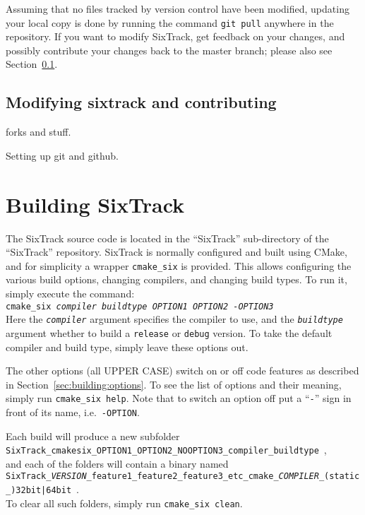 \documentclass[english]{article}
\begin{document}
Assuming that no files tracked by version control have been modified, updating your local copy is done by running the command
\texttt{git pull} anywhere in the repository.
If you want to modify SixTrack, get feedback on your changes, and possibly contribute your changes back to the master branch; please also see Section~\ref{sec:downloading:contributing}.

\subsection{Modifying sixtrack and contributing}
\label{sec:downloading:contributing}


forks and stuff.

Setting up git and github.


\section{Building SixTrack}
\label{sec:building}

The SixTrack source code is located in the ``SixTrack'' sub-directory of the ``SixTrack'' repository.
SixTrack is normally configured and built using CMake, and for simplicity a wrapper \texttt{cmake\_six} is provided.
This allows configuring the various build options, changing compilers, and changing build types.
To run it, simply execute the command:\\
\texttt{cmake\_six \textit{compiler} \textit{buildtype} \textit{OPTION1} \textit{OPTION2} \textit{-OPTION3}}\\
Here the \texttt{\textit{compiler}} argument specifies the compiler to use, and the \texttt{\textit{buildtype}} argument whether to build a \texttt{release} or \texttt{debug} version.
To take the default compiler and build type, simply leave these options out.

The other options (all UPPER CASE) switch on or off code features as described in Section~\ref{sec:building:options}.
To see the list of options and their meaning, simply run \texttt{cmake\_six help}.
Note that to switch an option off put a ``\texttt{-}'' sign in front of its name, i.e.\ \texttt{-OPTION}.

Each build will produce a new subfolder\\
{
  \texttt{SixTrack\_\-cmakesix\_\-OPTION1\_\-OPTION2\_\-NOOPTION3\_\-compiler\_\-buildtype}~,\\
}
and each of the folders will contain a binary named\\
{\scriptsize
  \texttt{SixTrack\_\textit{VERSION}\_feature1\_feature2\_feature3\_etc\_cmake\_\textit{COMPILER}\_(static\_){32bit|64bit}}~.\\
}
To clear all such folders, simply run \texttt{cmake\_six clean}.
\end{document}
